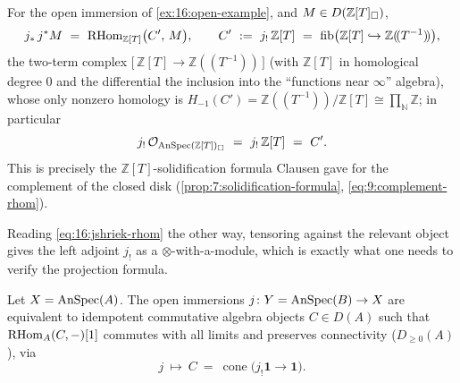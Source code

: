 \begin{proposition}
\label{prop:16:jshriek-formula}
For the open immersion of \cref{ex:16:open-example}, and $M\in D(\mathbb{Z}[T]_\square)$,
\begin{equation}
\label{eq:16:jshriek-rhom}
j_*\,j^*M\ =\ \RHom_{\mathbb{Z}[T]}\bigl(C',\,M\bigr),\qquad
C'\ :=\ j_!\,\mathbb{Z}[T]\ =\ \operatorname{fib}\bigl(\mathbb{Z}[T]\hookrightarrow\mathbb{Z}(\!(T^{-1})\!)\bigr),
\end{equation}
the two-term complex $\bigl[\,\mathbb{Z}[T]\to\mathbb{Z}(\!(T^{-1})\!)\,\bigr]$ (with
$\mathbb{Z}[T]$ in homological degree $0$ and the differential the inclusion into the
``functions near $\infty$'' algebra), whose only nonzero homology is
$H_{-1}(C')=\mathbb{Z}(\!(T^{-1})\!)/\mathbb{Z}[T]\cong\prod_{\mathbb{N}}\mathbb{Z}$; in
particular
\begin{equation*}
j_!\,\mathcal{O}_{\AnSpec(\mathbb{Z}[T])_\solid}\ =\ j_!\,\mathbb{Z}[T]\ =\ C'.
\end{equation*}
This is precisely the $\mathbb{Z}[T]$-solidification formula Clausen gave for the
complement of the closed disk (\cref{prop:7:solidification-formula},
\cref{eq:9:complement-rhom}).
\end{proposition}

Reading \eqref{eq:16:jshriek-rhom} the other way, tensoring against the relevant object
gives the left adjoint $j_!$ as a $\otimes$-with-a-module, which is exactly what one
needs to verify the projection formula.

\begin{proposition}[Open immersions $=$ idempotent algebras]
\label{prop:16:open-idempotent}
Let $X=\operatorname{AnSpec}(A)$. The open immersions $j\colon Y=\operatorname{AnSpec}(B)\to X$ are equivalent to
idempotent commutative algebra objects $C\in D(A)$ such that $\mathrm{RHom}_A(C,-)[1]$ commutes
with all limits and preserves connectivity ($D_{\ge0}(A)$), via
\begin{equation*}
j\ \longmapsto\ C\ =\ \operatorname{cone}\bigl(j_!\mathbf 1\to\mathbf 1\bigr).
\end{equation*}
\end{proposition}


